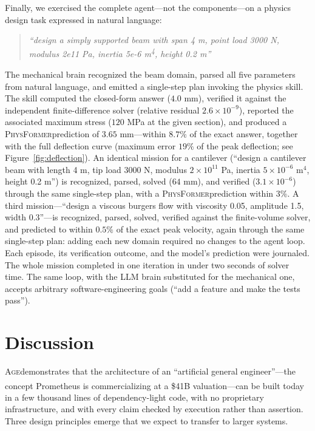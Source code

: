 \documentclass[11pt,a4paper]{article}
\newcommand{\Age}{\textsc{Age}}
\newcommand{\PhysFormer}{\textsc{PhysFormer}}
\newcommand{\pn}{\textsuperscript}
\begin{document}
Finally, we exercised the complete agent---not the components---on a physics
design task expressed in natural language:

\begin{quote}
\emph{``design a simply supported beam with span 4 m, point load 3000 N,
modulus 2e11 Pa, inertia 5e-6 m\textsuperscript{4}, height 0.2 m''}
\end{quote}

The mechanical brain recognized the beam domain, parsed all five parameters
from natural language, and emitted a single-step plan invoking the physics
skill. The skill computed the closed-form answer ($4.0$ mm), verified it
against the independent finite-difference solver (relative residual
$2.6\times10^{-9}$), reported the associated maximum stress
($120$ MPa at the given section), and produced a \PhysFormer prediction of
$3.65$ mm---within $8.7\%$ of the exact answer, together with the full
deflection curve (maximum error $19\%$ of the peak deflection; see
Figure~\ref{fig:deflection}). An identical mission for a cantilever
(``design a cantilever beam with length 4 m, tip load 3000 N, modulus
$2\times10^{11}$ Pa, inertia $5\times10^{-6}$ m$^4$, height 0.2 m'') is
recognized, parsed, solved ($64$ mm), and verified ($3.1\times10^{-6}$)
through the same single-step plan, with a \PhysFormer prediction within
$3\%$. A third mission---``design a viscous burgers flow with viscosity
0.05, amplitude 1.5, width 0.3''---is recognized, parsed, solved, verified
against the finite-volume solver, and predicted to within $0.5\%$ of the
exact peak velocity, again through the same single-step plan: adding each
new domain required no changes to the agent loop. Each episode, its
verification outcome, and the model's prediction were journaled. The whole
mission completed in one iteration in under two seconds of solver time.
The same loop, with the LLM brain substituted for the mechanical one,
accepts arbitrary software-engineering goals (``add a feature and make the
tests pass'').

\section{Discussion}

\Age demonstrates that the architecture of an ``artificial general
engineer''---the concept Prometheus is commercializing at a \$41B
valuation\pn{\citep{techcrunch2026}}---can be built today in a few thousand
lines of dependency-light code, with no proprietary infrastructure, and with
every claim checked by execution rather than assertion. Three design
principles emerge that we expect to transfer to larger systems.
\end{document}
